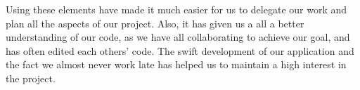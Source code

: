 Using these elements have made it much easier for us to delegate our work and plan all the aspects of our project. Also, it has given us a all a better understanding of our code, as we have all collaborating to achieve our goal, and has often edited each others' code. The swift development of our application and the fact we almost never work late has helped us to maintain a high interest in the project.